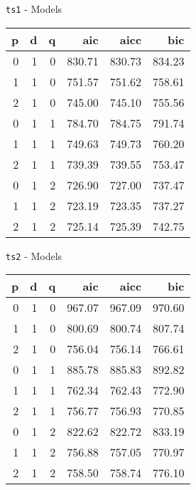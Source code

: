 \documentclass[11pt,ignorenonframetext,]{beamer}
\begin{document}
\begin{frame}{\texttt{ts1} - Models}
\protect\hypertarget{ts1---models}{}

\begin{longtable}[]{@{}rrrrrr@{}}
\toprule
p & d & q & aic & aicc & bic\tabularnewline
\midrule
\endhead
0 & 1 & 0 & 830.71 & 830.73 & 834.23\tabularnewline
1 & 1 & 0 & 751.57 & 751.62 & 758.61\tabularnewline
2 & 1 & 0 & 745.00 & 745.10 & 755.56\tabularnewline
0 & 1 & 1 & 784.70 & 784.75 & 791.74\tabularnewline
1 & 1 & 1 & 749.63 & 749.73 & 760.20\tabularnewline
2 & 1 & 1 & 739.39 & 739.55 & 753.47\tabularnewline
0 & 1 & 2 & 726.90 & 727.00 & 737.47\tabularnewline
1 & 1 & 2 & 723.19 & 723.35 & 737.27\tabularnewline
2 & 1 & 2 & 725.14 & 725.39 & 742.75\tabularnewline
\bottomrule
\end{longtable}

\end{frame}

\begin{frame}{\texttt{ts2} - Models}
\protect\hypertarget{ts2---models}{}

\begin{longtable}[]{@{}rrrrrr@{}}
\toprule
p & d & q & aic & aicc & bic\tabularnewline
\midrule
\endhead
0 & 1 & 0 & 967.07 & 967.09 & 970.60\tabularnewline
1 & 1 & 0 & 800.69 & 800.74 & 807.74\tabularnewline
2 & 1 & 0 & 756.04 & 756.14 & 766.61\tabularnewline
0 & 1 & 1 & 885.78 & 885.83 & 892.82\tabularnewline
1 & 1 & 1 & 762.34 & 762.43 & 772.90\tabularnewline
2 & 1 & 1 & 756.77 & 756.93 & 770.85\tabularnewline
0 & 1 & 2 & 822.62 & 822.72 & 833.19\tabularnewline
1 & 1 & 2 & 756.88 & 757.05 & 770.97\tabularnewline
2 & 1 & 2 & 758.50 & 758.74 & 776.10\tabularnewline
\bottomrule
\end{longtable}

\end{frame}
\end{document}
